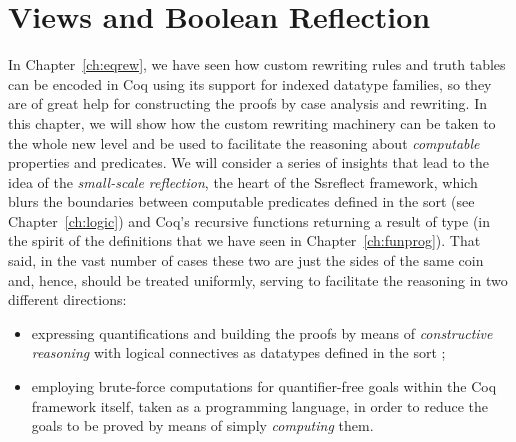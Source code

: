 \begin{coqdoccode}
\coqdocemptyline
\coqdocemptyline
\end{coqdoccode}


\chapter{Views and Boolean Reflection}
\label{ch:boolrefl}






In Chapter~\ref{ch:eqrew}, we have seen how custom rewriting rules
and truth tables can be encoded in Coq using its support for indexed
datatype families, so they are of great help for constructing the
proofs by case analysis and rewriting. In this chapter, we will show
how the custom rewriting machinery can be taken to the whole new level
and be used to facilitate the reasoning about \textit{computable} properties
and predicates. We will consider a series of insights that lead to the
idea of the \textit{small-scale reflection}, the heart of the Ssreflect
  framework, which blurs the boundaries
between computable predicates defined in the sort  (see
Chapter~\ref{ch:logic}) and Coq's recursive functions returning a
result of type  (in the spirit of the definitions that we have
seen in Chapter~\ref{ch:funprog}). That said, in the vast number of
cases these two are just the sides of the same coin and, hence, should
be treated uniformly, serving to facilitate the reasoning in two
different directions: 



\begin{itemize}
\item  expressing quantifications and building the proofs by means of
  \textit{constructive reasoning} with logical connectives as datatypes
  defined in the sort ;



\item  employing brute-force computations for quantifier-free goals within
  the Coq framework itself, taken as a programming language, in order
  to reduce the goals to be proved by means of simply \textit{computing}
  them.

\end{itemize}


